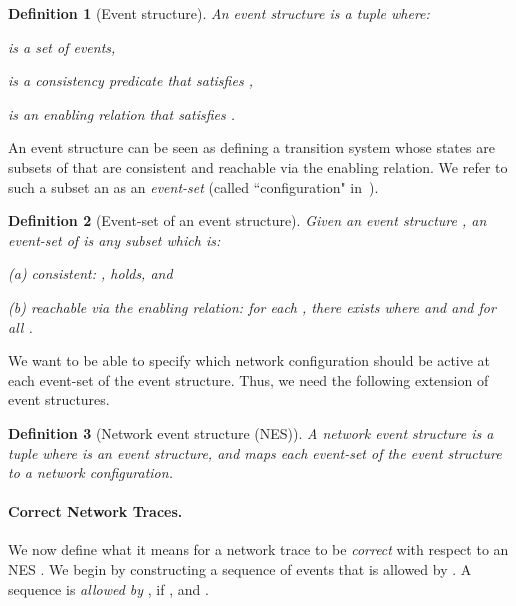 \documentclass[pldi-cameraready]{sigplanconf}
\newtheorem{definition}{Definition}
\begin{document}
\begin{definition}[Event structure]
\label{def:event_struct}
An event structure is a tuple  where:
\begin{compactitem}
\item  is a set of events, 
\item  is a
  consistency predicate that satisfies , \item  is an enabling relation that satisfies .
\end{compactitem}
\end{definition}

\noindent An event structure can be seen as defining a transition
system whose states are subsets of 
that are
consistent and reachable via the enabling relation. We refer to such a
subset an as an {\em event-set} (called ``configuration"
in~\cite{winskel1987event}).

\begin{definition}[Event-set of an event structure]
\label{def:event_struct_config}
Given an event structure , an {\em
  event-set} of  is any subset  which is:
\begin{inparaenum}
\item[(a)] consistent: ,  holds, and
\item[(b)] reachable via the enabling relation: for each , there
  exists  where  and  and
   for all . 
\end{inparaenum}
\end{definition}

We want to be able to specify which network configuration should be
active at each event-set of the event structure.  Thus, we need the
following extension of event structures.


\begin{definition}[Network event structure (NES)]
A {\em network event structure} is a tuple
 where
 is an event structure, and
 maps each
event-set of the event structure to a network configuration.
\end{definition}



\paragraph*{Correct Network Traces.}
\label{sec:correct_trace}
We now define what it means for a network trace 
to be {\em correct} with respect to an
NES . We begin by constructing a
sequence  of events that is allowed by . A sequence  is {\em allowed by} , if 
, and
.
\end{document}
